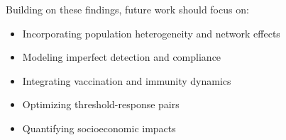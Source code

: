 \documentclass{article} %
\begin{document}
Building on these findings, future work should focus on:
\begin{itemize}
    \item Incorporating population heterogeneity and network effects
    \item Modeling imperfect detection and compliance
    \item Integrating vaccination and immunity dynamics
    \item Optimizing threshold-response pairs
    \item Quantifying socioeconomic impacts
\end{itemize}




\end{document}

